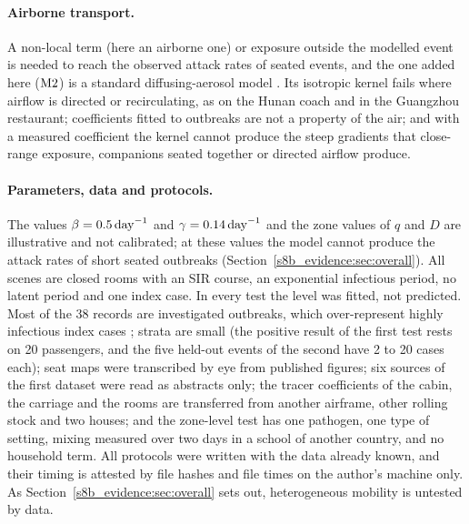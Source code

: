 \paragraph{Airborne transport.} A non-local term (here an airborne one) or exposure outside the modelled event is
needed to reach the observed attack rates of seated events, and the one added here ($\mathrm{M2}$) is a standard
diffusing-aerosol model \citep{venkatram2021modeling,lau2022predicting}. Its isotropic kernel fails where airflow
is directed or recirculating, as on the Hunan coach and in the Guangzhou restaurant; coefficients fitted to
outbreaks are not a property of the air; and with a measured coefficient the kernel cannot produce the steep
gradients that close-range exposure, companions seated together or directed airflow produce.

\paragraph{Parameters, data and protocols.} The values $\beta=0.5\,\mathrm{day}^{-1}$ and $\gamma=0.14\,\mathrm{day}^{-1}$ and the zone
values of $q$ and $D$ are illustrative and not calibrated; at these values the model cannot produce the attack
rates of short seated outbreaks (Section~\ref{s8b_evidence:sec:overall}). All scenes are closed rooms with an SIR course, an
exponential infectious period, no latent period and one index case. In every test the level was fitted, not
predicted. Most of the 38 records are investigated outbreaks, which over-represent highly infectious index cases
\citep{lloydsmith2005superspreading,endo2020estimating}; strata are small (the positive result of the first test
rests on 20 passengers, and the five held-out events of the second have 2 to 20 cases each); seat maps were
transcribed by eye from published figures; six sources of the first dataset were read as abstracts only; the
tracer coefficients of the cabin, the carriage and the rooms are transferred from another airframe, other rolling
stock and two houses; and the zone-level test has one pathogen, one type of setting, mixing measured over two
days in a school of another country, and no household term. All protocols were written with the data
already known, and their timing is attested by file hashes and file times on the author's machine only. As
Section~\ref{s8b_evidence:sec:overall} sets out, heterogeneous mobility is untested by data.

